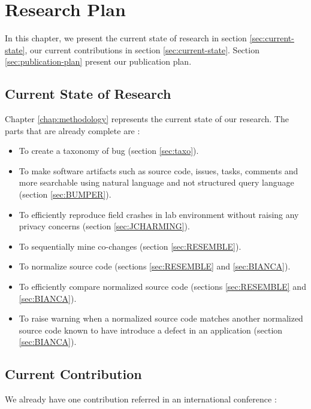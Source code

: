 
\chapter{Research Plan\label{chap:plan}}

In this chapter, we present the current state of research in section \ref{sec:current-state}, our current contributions in section \ref{sec:current-state}. Section \ref{sec:publication-plan} present our publication plan.

\section{Current State of Research\label{sec:current-state}}

Chapter \ref{chap:methodology} represents the current state of our research. The parts that are already complete are :

\begin{itemize}
	\item To create a taxonomy of bug (section \ref{sec:taxo}).
	\item To make software artifacts such as source code, issues, tasks, comments and more searchable using natural language and not structured query language (section \ref{sec:BUMPER}).
	\item To efficiently reproduce field crashes in lab environment without raising any privacy concerns (section \ref{sec:JCHARMING}).
	\item To sequentially mine co-changes (section \ref{sec:RESEMBLE}).
	\item To normalize source code (sections \ref{sec:RESEMBLE} and \ref{sec:BIANCA}).
	\item To efficiently compare normalized source code (sections \ref{sec:RESEMBLE} and \ref{sec:BIANCA}).
	\item To raise warning when a normalized source code matches another normalized source code known to have introduce a defect in an application (section \ref{sec:BIANCA}).
\end{itemize}

\section{Current Contribution\label{sec:current-state}}

We already have one contribution referred in an international conference \cite{Nayrolles2015}:
\\ 

